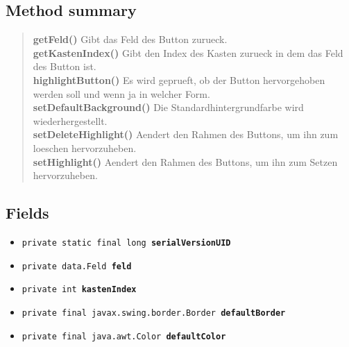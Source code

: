 \documentclass[11pt,a4paper]{report}
\begin{document}
{{{{{{{{{{{{{{{{{\subsection{Method summary}{
\begin{verse}
{\bf getFeld()} Gibt das Feld des Button zurueck.\\
{\bf getKastenIndex()} Gibt den Index des Kasten zurueck in dem das Feld des Button ist.\\
{\bf highlightButton()} Es wird geprueft, ob der Button hervorgehoben werden soll und wenn ja in welcher Form.\\
{\bf setDefaultBackground()} Die Standardhintergrundfarbe wird wiederhergestellt.\\
{\bf setDeleteHighlight()} Aendert den Rahmen des Buttons, um ihn zum loeschen hervorzuheben.\\
{\bf setHighlight()} Aendert den Rahmen des Buttons, um ihn zum Setzen hervorzuheben.\\
\end{verse}
}
\subsection{Fields}{
\begin{itemize}
\item{
\label{view.CustomButton.serialVersionUID}\texttt{private static final long\ {\bf  serialVersionUID}}
}
\item{
\label{view.CustomButton.feld}\texttt{private data.Feld\ {\bf  feld}}
}
\item{
\label{view.CustomButton.kastenIndex}\texttt{private int\ {\bf  kastenIndex}}
}
\item{
\label{view.CustomButton.defaultBorder}\texttt{private final javax.swing.border.Border\ {\bf  defaultBorder}}
}
\item{
\label{view.CustomButton.defaultColor}\texttt{private final java.awt.Color\ {\bf  defaultColor}}
}
\end{itemize}
}
}}}}}}}}}}}}}}}}}
\end{document}
